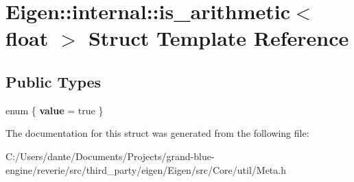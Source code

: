 \hypertarget{struct_eigen_1_1internal_1_1is__arithmetic_3_01float_01_4}{}\section{Eigen\+::internal\+::is\+\_\+arithmetic$<$ float $>$ Struct Template Reference}
\label{struct_eigen_1_1internal_1_1is__arithmetic_3_01float_01_4}
\subsection*{Public Types}
\begin{DoxyCompactItemize}
\item 
\mbox{\label{struct_eigen_1_1internal_1_1is__arithmetic_3_01float_01_4_a9181cb2548b600e590b1c6727f553e01}} 
enum \{ {\bfseries value} = true
 \}
\end{DoxyCompactItemize}


The documentation for this struct was generated from the following file\+:\begin{DoxyCompactItemize}
\item 
C\+:/\+Users/dante/\+Documents/\+Projects/grand-\/blue-\/engine/reverie/src/third\+\_\+party/eigen/\+Eigen/src/\+Core/util/Meta.\+h\end{DoxyCompactItemize}
